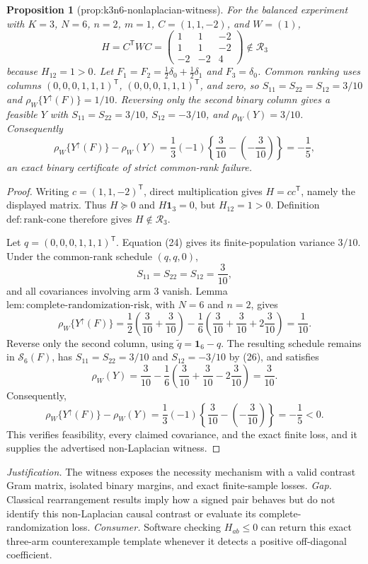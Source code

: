 \documentclass{article}
\newtheorem{proposition}{Proposition}
\begin{document}
\begin{proposition}[prop:k3n6-nonlaplacian-witness]\label{prop:k3n6-nonlaplacian-witness}
For the balanced experiment with \(K=3\), \(N=6\), \(n=2\), \(m=1\), \(C=(1,1,-2)\), and \(W=(1)\), \[H=C^{\mathsf T}WC=\begin{pmatrix}1&1&-2\\1&1&-2\\-2&-2&4\end{pmatrix}\notin\mathcal R_3\] because \(H_{12}=1>0\). Let \(F_1=F_2=\tfrac12\delta_0+\tfrac12\delta_1\) and \(F_3=\delta_0\). Common ranking uses columns \((0,0,0,1,1,1)^{\mathsf T}\), \((0,0,0,1,1,1)^{\mathsf T}\), and zero, so \(S_{11}=S_{22}=S_{12}=3/10\) and \(\rho_W\{Y^{\uparrow}(F)\}=1/10\). Reversing only the second binary column gives a feasible \(Y\) with \(S_{11}=S_{22}=3/10\), \(S_{12}=-3/10\), and \(\rho_W(Y)=3/10\). Consequently \[\rho_W\{Y^{\uparrow}(F)\}-\rho_W(Y)=\frac{1}{3}(-1)\left\{\frac{3}{10}-\left(-\frac{3}{10}\right)\right\}=-\frac{1}{5},\] an exact binary certificate of strict common-rank failure.
\end{proposition}
\begin{proof}
Writing \(c=(1,1,-2)^{\mathsf T}\), direct multiplication gives \(H=cc^{\mathsf T}\), namely the displayed matrix.  Thus \(H\succeq0\) and \(H\mathbf 1_3=0\), but \(H_{12}=1>0\).  Definition \(\mathrm{def{:}rank\text{-}cone}\) therefore gives \(H\notin\mathcal R_3\).

Let \(q=(0,0,0,1,1,1)^{\mathsf T}\).  Equation (24) gives its finite-population variance \(3/10\).  Under the common-rank schedule \((q,q,0)\),
\[
S_{11}=S_{22}=S_{12}=\frac3{10},
\]
and all covariances involving arm \(3\) vanish.  Lemma \(\mathrm{lem{:}complete\text{-}randomization\text{-}risk}\), with \(N=6\) and \(n=2\), gives
\[
\rho_W\{Y^{\uparrow}(F)\}
=\frac12\left(\frac3{10}+\frac3{10}\right)
-\frac16\left(\frac3{10}+\frac3{10}+2\frac3{10}\right)
=\frac1{10}. \tag{30}
\]
Reverse only the second column, using \(\widetilde q=\mathbf 1_6-q\).  The resulting schedule remains in \(\mathcal S_6(F)\), has \(S_{11}=S_{22}=3/10\) and \(S_{12}=-3/10\) by (26), and satisfies
\[
\rho_W(Y)
=\frac3{10}-\frac16\left(\frac3{10}+\frac3{10}-2\frac3{10}\right)
=\frac3{10}. \tag{31}
\]
Consequently,
\[
\rho_W\{Y^{\uparrow}(F)\}-\rho_W(Y)
=\frac13(-1)\left\{\frac3{10}-\left(-\frac3{10}\right)\right\}
=-\frac15<0. \tag{32}
\]
This verifies feasibility, every claimed covariance, and the exact finite loss, and it supplies the advertised non-Laplacian witness.
\end{proof}
\par\smallskip\noindent \textit{Justification.} The witness exposes the necessity mechanism with a valid contrast Gram matrix, isolated binary margins, and exact finite-sample losses. \textit{Gap.} Classical rearrangement results imply how a signed pair behaves but do not identify this non-Laplacian causal contrast or evaluate its complete-randomization loss. \textit{Consumer.} Software checking \(H_{ab}\leq0\) can return this exact three-arm counterexample template whenever it detects a positive off-diagonal coefficient.
\end{document}
